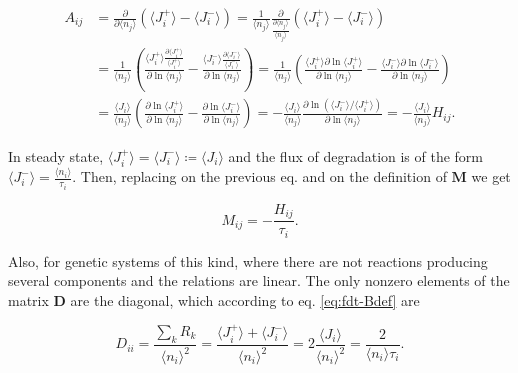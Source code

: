 \begin{equation}
  \begin{split}
    A_{ij}&=\frac{\partial}{\partial \langle n_j\rangle}\left(\langle J_i^+\rangle - \langle J_i^-\rangle\right) = \frac{1}{\langle n_j\rangle}\frac{\partial}{\frac{\partial \langle n_j\rangle}{\langle n_j\rangle}}\left(\langle J_i^+\rangle - \langle J_i^-\rangle\right)\\
    &=\frac{1}{\langle n_j\rangle}\left(\frac{\langle J_i^+\rangle\frac{\partial \langle J_i^+\rangle}{\langle J_i^+\rangle}}{\partial\ln \langle n_j\rangle} - \frac{\langle  J_i^-\rangle\frac{\partial \langle J_i^-\rangle}{\langle J_i^-\rangle}}{\partial\ln \langle n_j\rangle} \right) = \frac{1}{\langle n_j\rangle}\left(\frac{\langle J_i^+\rangle \partial\ln\langle J_i^+\rangle}{\partial\ln \langle n_j\rangle} - \frac{\langle  J_i^-\rangle\partial\ln\langle J_i^-\rangle}{\partial\ln \langle n_j\rangle} \right)\\
    &=\frac{\langle J_i\rangle}{\langle n_j\rangle}\left(\frac{\partial\ln\langle J_i^+\rangle}{\partial\ln \langle n_j\rangle} - \frac{\partial\ln\langle J_i^-\rangle}{\partial\ln \langle n_j\rangle} \right) =-\frac{\langle J_i\rangle}{\langle n_j\rangle}\frac{\partial\ln \left( \langle J_i^-\rangle/\langle J_i^+\rangle \right)}{\partial\ln \langle n_j\rangle} = -\frac{\langle J_i\rangle}{\langle n_j\rangle}H_{ij}.
  \end{split}
\end{equation}

In steady state, $\langle J_i^+\rangle = \langle J_i^-\rangle \coloneqq \langle J_i\rangle$ and the flux of degradation is of the form $\langle J_i^-\rangle = \frac{\langle n_i\rangle}{\tau_i}$. Then, replacing on the previous eq. and on the definition of $\mathbf{M}$ we get

\begin{equation*}
  M_{ij} = -\frac{H_{ij}}{\tau_i}.
\end{equation*}

Also, for genetic systems of this kind, where there are not reactions producing several components and the relations are linear. The only nonzero elements of the matrix $\mathbf{D}$ are the diagonal, which according to eq. \eqref{eq:fdt-Bdef} are

\begin{equation*}
 D_{ii} = \frac{\sum_k R_k}{\langle n_i\rangle^2} =  \frac{\langle J_i^+\rangle + \langle J_i^-\rangle}{\langle n_i\rangle^2} = 2\frac{\langle J_i\rangle}{\langle n_i\rangle^2} = \frac{2}{\langle n_i\rangle\tau_i}.
\end{equation*}

